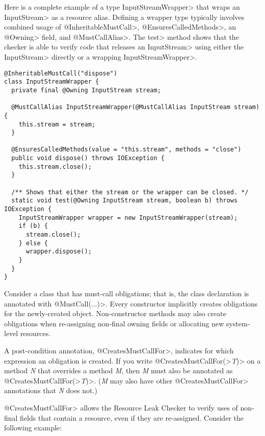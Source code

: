 
Here is a complete example of a type \<InputStreamWrapper> that wraps an \<InputStream> as a resource alias.  Defining a wrapper type typically involves combined usage of \<@InheritableMustCall>, \<@EnsuresCalledMethods>, an \<@Owning> field, and \<@MustCallAlias>.  The \<test> method shows that the checker is able to verify code that releases an \<InputStream> using either the \<InputStream> directly or a wrapping \<InputStreamWrapper>.

\begin{verbatim}
@InheritableMustCall("dispose")
class InputStreamWrapper {
  private final @Owning InputStream stream;

  @MustCallAlias InputStreamWrapper(@MustCallAlias InputStream stream) {
    this.stream = stream;
  }

  @EnsuresCalledMethods(value = "this.stream", methods = "close")
  public void dispose() throws IOException {
    this.stream.close();
  }

  /** Shows that either the stream or the wrapper can be closed. */
  static void test(@Owning InputStream stream, boolean b) throws IOException {
    InputStreamWrapper wrapper = new InputStreamWrapper(stream);
    if (b) {
      stream.close();
    } else {
      wrapper.dispose();
    }
  }
}
\end{verbatim}



Consider a class that has must-call obligations; that is, the class
declaration is annotated with \<@MustCall(...)>.
Every constructor implicitly creates obligations for the newly-created object.
Non-constructor methods may also create obligations
when re-assigning non-final owning fields or allocating
new system-level resources.

A post-condition annotation,
\<@CreatesMustCallFor>,
indicates for which expression an obligation is created.
If you write \<@CreatesMustCallFor(>\emph{T}\<)> on a method \emph{N} that
overrides a method \emph{M}, then \emph{M} must also be annotated as
\<@CreatesMustCallFor(>\emph{T}\<)>.  (\emph{M} may also have other
\<@CreatesMustCallFor> annotations that \emph{N} does not.)

\<@CreatesMustCallFor> allows the Resource Leak Checker to verify uses of non-final fields
that contain a resource, even if they are re-assigned. Consider
the following example:

